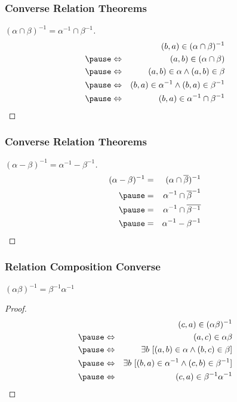 \documentclass[dvipsnames]{beamer}
\begin{document}
\begin{frame}
  \frametitle{Converse Relation Theorems}

  \begin{proof}[$(\alpha \cap \beta)^{-1} = \alpha^{-1} \cap \beta^{-1}$]
    \pause
    \begin{eqnarray*}
      &                 & (b,a) \in (\alpha \cap \beta)^{-1}\\\pause
      & \Leftrightarrow & (a,b) \in (\alpha \cap \beta)\\\pause
      & \Leftrightarrow & (a,b) \in \alpha \wedge (a,b) \in \beta\\\pause
      & \Leftrightarrow & (b,a) \in \alpha^{-1}
                   \wedge (b,a) \in \beta^{-1}\\\pause
      & \Leftrightarrow & (b,a) \in \alpha^{-1} \cap \beta^{-1}
    \end{eqnarray*}
  \end{proof}
\end{frame}

\begin{frame}
  \frametitle{Converse Relation Theorems}

  \begin{proof}[$(\alpha - \beta)^{-1} = \alpha^{-1} - \beta^{-1}$]
    \pause
    \begin{eqnarray*}
      (\alpha - \beta)^{-1} & = & (\alpha \cap \overline{\beta})^{-1}\\\pause
                            & = & \alpha^{-1} \cap \overline{\beta}^{-1}\\\pause
                            & = & \alpha^{-1} \cap \overline{\beta^{-1}}\\\pause
                            & = & \alpha^{-1} - \beta^{-1}
    \end{eqnarray*}
  \end{proof}
\end{frame}

\begin{frame}
  \frametitle{Relation Composition Converse}

  \begin{theorem}
    $(\alpha \beta)^{-1} = \beta^{-1} \alpha^{-1}$
  \end{theorem}

  \pause
  \begin{proof}
    \begin{eqnarray*}
      &                 & (c,a) \in (\alpha \beta)^{-1}\\\pause
      & \Leftrightarrow & (a,c) \in \alpha \beta\\\pause
      & \Leftrightarrow & \exists b~[(a,b) \in \alpha
                              \wedge (b,c) \in \beta]\\\pause
      & \Leftrightarrow & \exists b~[(b,a) \in \alpha^{-1}
                              \wedge (c,b) \in \beta^{-1}]\\\pause
      & \Leftrightarrow & (c,a) \in \beta^{-1}\alpha^{-1}
    \end{eqnarray*}
  \end{proof}
\end{frame}
\end{document}
